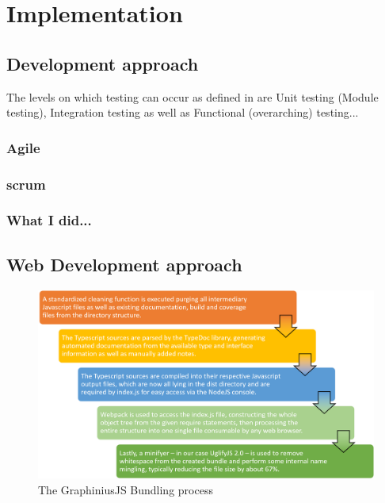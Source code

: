 \chapter{Implementation}
\label{ch:implementation}


\section{Development approach}
\label{sect:dev_approach}

The levels on which testing can occur as defined in \cite{Myers2004AST} are Unit testing (Module testing), Integration testing as well as Functional (overarching) testing...

	\subsection{Agile}
	\label{ssect:agile}
	
	\subsection{scrum}
	\label{ssect:scrum}
	
	\subsection{What I did...}
	\label{ssect:change_me}
	
	
	
\section{Web Development approach}
\label{sect:webdev_approach}


\begin{figure}[ht]
	\label{fig_webdev_approach}
	\hspace*{-0.5cm}
	\includegraphics[width=1.1\textwidth]{figures/bundle_process}
	\caption{The GraphiniusJS Bundling process}
\end{figure}



